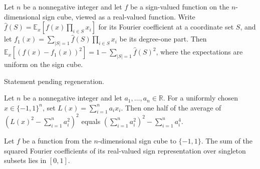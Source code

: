 \begin{theorem}
\label{FABL.expect_toReal_sub_degreePart_one_sq}
\leanok
{}
Let $n$ be a nonnegative integer and let $f$ be a sign-valued function on the
$n$-dimensional sign cube, viewed as a real-valued function. Write $\widehat
f(S)=\mathbb{E}_x[f(x)\prod_{i\in S}x_i]$ for its Fourier coefficient at a coordinate
set $S$, and let $f_1(x)=\sum_{|S|=1}\widehat f(S)\prod_{i\in S}x_i$ be its degree-one
part. Then $\mathbb{E}_x[(f(x)-f_1(x))^2]=1-\sum_{|S|=1}\widehat f(S)^2$, where the
expectations are uniform on the sign cube.
\end{theorem}

\begin{theorem}
\label{FABL.variance_linearForm_sq}
\leanok
{}
Statement pending regeneration.
\end{theorem}

\begin{theorem}
\label{FABL.expect_centeredLinearSquare_sq}
\leanok
{}
Let $n$ be a nonnegative integer and let $a_1,\ldots,a_n\in\mathbb{R}$. For a uniformly
chosen $x\in\{-1,1\}^n$, set $L(x)=\sum_{i=1}^n a_i x_i$. Then one half of the average
of $\left(L(x)^2-\sum_{i=1}^n a_i^2\right)^2$ equals $\left(\sum_{i=1}^n
a_i^2\right)^2-\sum_{i=1}^n a_i^4$.
\end{theorem}

\begin{theorem}
\label{FABL.fourierWeightAtLevel_one_mem_Icc}
\leanok
{}
Let $f$ be a function from the $n$-dimensional sign cube to $\{-1,1\}$. The sum of the
squared Fourier coefficients of its real-valued sign representation over singleton
subsets lies in $[0,1]$.
\end{theorem}

